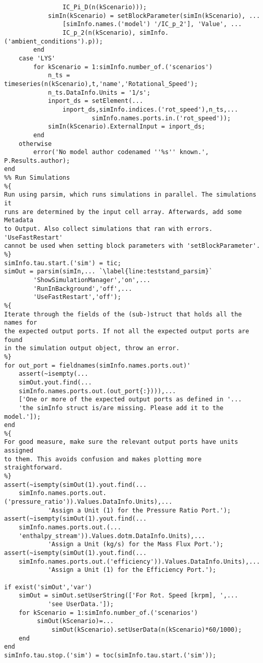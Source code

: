\begin{lstlisting}
                IC_Pi_D(n(kScenario)));
            simIn(kScenario) = setBlockParameter(simIn(kScenario), ...
                [simInfo.names.('model') '/IC_p_2'], 'Value', ...
                IC_p_2(n(kScenario), simInfo.('ambient_conditions').p));
        end
    case 'LYS'
        for kScenario = 1:simInfo.number_of.('scenarios')
            n_ts = timeseries(n(kScenario),t,'name','Rotational_Speed');
            n_ts.DataInfo.Units = '1/s';
            inport_ds = setElement(...
                inport_ds,simInfo.indices.('rot_speed'),n_ts,...
                        simInfo.names.ports.in.('rot_speed'));
            simIn(kScenario).ExternalInput = inport_ds;
        end
    otherwise
        error('No model author codenamed ''%s'' known.', P.Results.author);
end
%% Run Simulations
%{
Run using parsim, which runs simulations in parallel. The simulations it
runs are determined by the input cell array. Afterwards, add some Metadata
to Output. Also collect simulations that ran with errors. 'UseFastRestart'
cannot be used when setting block parameters with 'setBlockParameter'.
%}
simInfo.tau.start.('sim') = tic;
simOut = parsim(simIn,... `\label{line:teststand_parsim}`
        'ShowSimulationManager','on',...
        'RunInBackground','off',...
        'UseFastRestart','off');
%{
Iterate through the fields of the (sub-)struct that holds all the names for
the expected output ports. If not all the expected output ports are found
in the simulation output object, throw an error.
%}
for out_port = fieldnames(simInfo.names.ports.out)'
    assert(~isempty(...
    simOut.yout.find(...
    simInfo.names.ports.out.(out_port{:}))),...
    ['One or more of the expected output ports as defined in '...
    'the simInfo struct is/are missing. Please add it to the model.']);
end
%{
For good measure, make sure the relevant output ports have units assigned
to them. This avoids confusion and makes plotting more straightforward.
%}
assert(~isempty(simOut(1).yout.find(...
    simInfo.names.ports.out.('pressure_ratio')).Values.DataInfo.Units),...
            'Assign a Unit (1) for the Pressure Ratio Port.');
assert(~isempty(simOut(1).yout.find(...
    simInfo.names.ports.out.(...
    'enthalpy_stream')).Values.dotm.DataInfo.Units),...
            'Assign a Unit (kg/s) for the Mass Flux Port.');
assert(~isempty(simOut(1).yout.find(...
    simInfo.names.ports.out.('efficiency')).Values.DataInfo.Units),...
            'Assign a Unit (1) for the Efficiency Port.');
        
if exist('simOut','var')
    simOut = simOut.setUserString(['For Rot. Speed [krpm], ',...
            'see UserData.']);
    for kScenario = 1:simInfo.number_of.('scenarios')
         simOut(kScenario)=...
             simOut(kScenario).setUserData(n(kScenario)*60/1000);   
    end
end
simInfo.tau.stop.('sim') = toc(simInfo.tau.start.('sim'));


\end{lstlisting}
